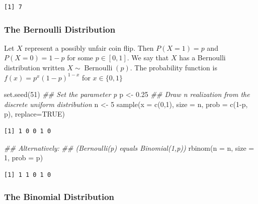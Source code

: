 \documentclass[
  letterpaper,
  DIV=11,
  numbers=noendperiod]{scrreprt}
\newenvironment{Shaded}{\begin{snugshade}}{\end{snugshade}}
\newcommand{\AttributeTok}[1]{\textcolor[rgb]{0.40,0.45,0.13}{#1}}
\newcommand{\ConstantTok}[1]{\textcolor[rgb]{0.56,0.35,0.01}{#1}}
\newcommand{\DecValTok}[1]{\textcolor[rgb]{0.68,0.00,0.00}{#1}}
\newcommand{\DocumentationTok}[1]{\textcolor[rgb]{0.37,0.37,0.37}{\textit{#1}}}
\newcommand{\FloatTok}[1]{\textcolor[rgb]{0.68,0.00,0.00}{#1}}
\newcommand{\FunctionTok}[1]{\textcolor[rgb]{0.28,0.35,0.67}{#1}}
\newcommand{\NormalTok}[1]{\textcolor[rgb]{0.00,0.23,0.31}{#1}}
\newcommand{\OtherTok}[1]{\textcolor[rgb]{0.00,0.23,0.31}{#1}}
\newcommand{\SpecialCharTok}[1]{\textcolor[rgb]{0.37,0.37,0.37}{#1}}
\theoremstyle{definition}
\theoremstyle{plain}
\theoremstyle{plain}
\theoremstyle{remark}
\begin{document}
\begin{verbatim}
[1] 7
\end{verbatim}

\hypertarget{the-bernoulli-distribution}{%
\subsubsection{The Bernoulli
Distribution}\label{the-bernoulli-distribution}}

Let \(X\) represent a possibly unfair coin flip. Then \(P(X=1)=p\) and
\(P(X=0)=1-p\) for some \(p \in[0,1]\). We say that \(X\) has a
Bernoulli distribution written \(X\sim\operatorname{Bernoulli }(p)\).
The probability function is \(f(x)=p^{x}(1-p)^{1-x}\) for
\(x \in\{0,1\}\)

\begin{Shaded}
\begin{Highlighting}[]
\FunctionTok{set.seed}\NormalTok{(}\DecValTok{51}\NormalTok{)}
\DocumentationTok{\#\# Set the parameter p}
\NormalTok{p }\OtherTok{\textless{}{-}} \FloatTok{0.25}
\DocumentationTok{\#\# Draw n realization from the discrete uniform distribution}
\NormalTok{n }\OtherTok{\textless{}{-}} \DecValTok{5}
\FunctionTok{sample}\NormalTok{(}\AttributeTok{x =} \FunctionTok{c}\NormalTok{(}\DecValTok{0}\NormalTok{,}\DecValTok{1}\NormalTok{), }\AttributeTok{size =}\NormalTok{ n, }\AttributeTok{prob =} \FunctionTok{c}\NormalTok{(}\DecValTok{1}\SpecialCharTok{{-}}\NormalTok{p, p), }\AttributeTok{replace=}\ConstantTok{TRUE}\NormalTok{)}
\end{Highlighting}
\end{Shaded}

\begin{verbatim}
[1] 1 0 0 1 0
\end{verbatim}

\begin{Shaded}
\begin{Highlighting}[]
\DocumentationTok{\#\# Alternatively:}
\DocumentationTok{\#\# (Bernoulli(p) equals Binomial(1,p))}
\FunctionTok{rbinom}\NormalTok{(}\AttributeTok{n =}\NormalTok{ n, }\AttributeTok{size =} \DecValTok{1}\NormalTok{, }\AttributeTok{prob =}\NormalTok{ p)}
\end{Highlighting}
\end{Shaded}

\begin{verbatim}
[1] 1 1 0 1 0
\end{verbatim}

\hypertarget{the-binomial-distribution}{%
\subsubsection{The Binomial
Distribution}\label{the-binomial-distribution}}
\end{document}
